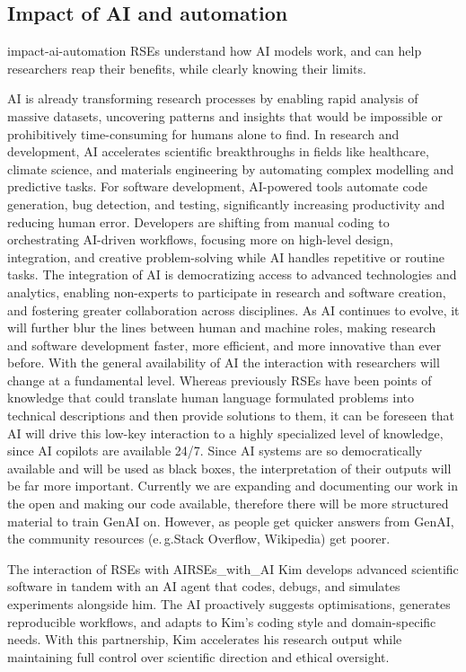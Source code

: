 \documentclass{eceasst}
\newcommand{\eg}{e.\,g.}
\begin{document}
\subsection{Impact of AI and automation}
\begin{whatis}{}{impact-ai-automation}
RSEs understand how AI models work, and can help researchers reap their benefits, while
clearly knowing their limits.
\end{whatis}
AI is already transforming research processes by enabling rapid analysis of massive datasets, uncovering patterns and insights that would be impossible or prohibitively time-consuming for humans alone to find.
In research and development, AI accelerates scientific breakthroughs in fields like healthcare, climate science, and materials engineering by automating complex modelling and predictive tasks.
For software development, AI-powered tools automate code generation, bug detection, and testing, significantly increasing productivity and reducing human error.
Developers are shifting from manual coding to orchestrating AI-driven workflows, focusing more on high-level design, integration, and creative problem-solving while AI handles repetitive or routine tasks.
The integration of AI is democratizing access to advanced technologies and analytics, enabling non-experts to participate in research and software creation, and fostering greater collaboration across disciplines.
As AI continues to evolve, it will further blur the lines between human and machine roles, making research and software development faster, more efficient, and more innovative than ever before.
With the general availability of AI the interaction with researchers will change at a fundamental level.
Whereas previously RSEs have been points of knowledge that could translate human language formulated problems into technical descriptions and then provide solutions to them,
it can be foreseen that AI will drive this low-key interaction to a highly specialized level of knowledge,
since AI copilots are available 24/7.
Since AI systems are so democratically available and will be used as black boxes,
the interpretation of their outputs will be far more important.
Currently we are expanding and documenting our work in the open and making our code available,
therefore there will be more structured material to train GenAI on.
However, as people get quicker answers from GenAI, the community resources (\eg Stack Overflow, Wikipedia)
get poorer.

\begin{story}{The interaction of RSEs with AI}{RSEs_with_AI}
Kim develops advanced scientific software in tandem with an AI agent that codes, debugs, and simulates experiments alongside him. The AI proactively suggests optimisations, generates reproducible workflows, and adapts to Kim’s coding style and domain-specific needs. With this partnership, Kim accelerates his research output while maintaining full control over scientific direction and ethical oversight.
\end{story}
\end{document}
